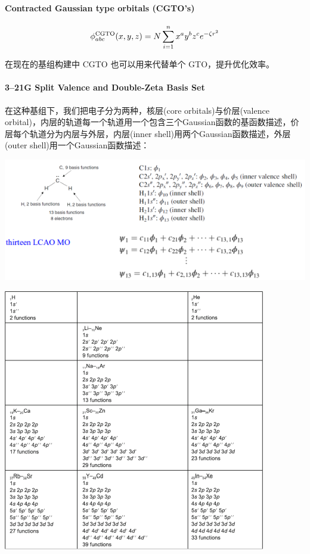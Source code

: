 \paragraph*{Contracted Gaussian type orbitals (CGTO's)}
\[\phi_{abc}^{\rm{CGTO}}(x,y,z)=N\sum_{i=1}^n x^ay^bz^ce^{-\zeta r^2}\]

在现在的基组构建中 CGTO 也可以用来代替单个 GTO，提升优化效率。

\paragraph*{3–21G Split Valence and Double-Zeta Basis Set}
在这种基组下，我们把电子分为两种，核层(core orbitals)与价层(valence orbital)，内层的轨道每一个轨道用一个包含三个Gaussian函数的基函数描述，价层每个轨道分为内层与外层，内层(inner shell)用两个Gaussian函数描述，外层(outer shell)用一个Gaussian函数描述：
\begin{center}
    \includegraphics[scale=0.9]{fig/lzhx/微信图片_20211102172815}
\end{center}
\begin{center}
    \includegraphics[scale=0.7]{fig/lzhx/微信图片_202111021728151}
\end{center}

